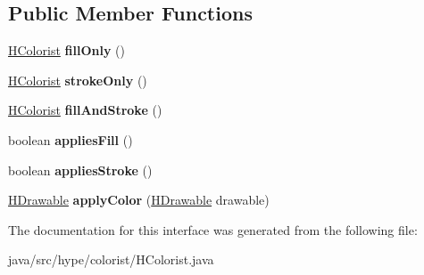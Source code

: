 \subsection*{Public Member Functions}
\begin{DoxyCompactItemize}
\item 
\hypertarget{interfacehype_1_1colorist_1_1_h_colorist_a5f9f9cae6981d0a4775a153402bea719}{\hyperlink{interfacehype_1_1colorist_1_1_h_colorist}{H\-Colorist} {\bfseries fill\-Only} ()}\label{interfacehype_1_1colorist_1_1_h_colorist_a5f9f9cae6981d0a4775a153402bea719}

\item 
\hypertarget{interfacehype_1_1colorist_1_1_h_colorist_ac55134266720e757465c9b60ca8f10eb}{\hyperlink{interfacehype_1_1colorist_1_1_h_colorist}{H\-Colorist} {\bfseries stroke\-Only} ()}\label{interfacehype_1_1colorist_1_1_h_colorist_ac55134266720e757465c9b60ca8f10eb}

\item 
\hypertarget{interfacehype_1_1colorist_1_1_h_colorist_ac17f131eb3153c400eb6efa1a8d3db61}{\hyperlink{interfacehype_1_1colorist_1_1_h_colorist}{H\-Colorist} {\bfseries fill\-And\-Stroke} ()}\label{interfacehype_1_1colorist_1_1_h_colorist_ac17f131eb3153c400eb6efa1a8d3db61}

\item 
\hypertarget{interfacehype_1_1colorist_1_1_h_colorist_acf79ff4b96368ee59574c5e733ac7227}{boolean {\bfseries applies\-Fill} ()}\label{interfacehype_1_1colorist_1_1_h_colorist_acf79ff4b96368ee59574c5e733ac7227}

\item 
\hypertarget{interfacehype_1_1colorist_1_1_h_colorist_ac1737f3e14cd909ff185c11feeae6a5c}{boolean {\bfseries applies\-Stroke} ()}\label{interfacehype_1_1colorist_1_1_h_colorist_ac1737f3e14cd909ff185c11feeae6a5c}

\item 
\hypertarget{interfacehype_1_1colorist_1_1_h_colorist_a2abb7d4de895ac051b6f2126fd83a5fc}{\hyperlink{classhype_1_1drawable_1_1_h_drawable}{H\-Drawable} {\bfseries apply\-Color} (\hyperlink{classhype_1_1drawable_1_1_h_drawable}{H\-Drawable} drawable)}\label{interfacehype_1_1colorist_1_1_h_colorist_a2abb7d4de895ac051b6f2126fd83a5fc}

\end{DoxyCompactItemize}


The documentation for this interface was generated from the following file\-:\begin{DoxyCompactItemize}
\item 
java/src/hype/colorist/H\-Colorist.\-java\end{DoxyCompactItemize}
